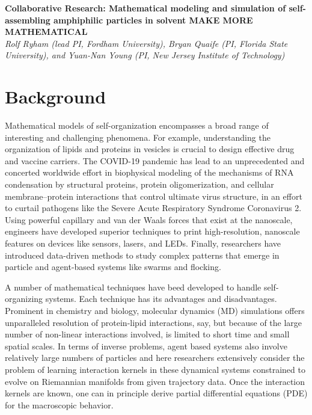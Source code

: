 \noindent
{\bf Collaborative Research: Mathematical modeling and simulation of
self-assembling amphiphilic particles in solvent {\bf MAKE MORE MATHEMATICAL}} \\
{\em Rolf Ryham (lead PI, Fordham University),
Bryan Quaife (PI, Florida State University), and
Yuan-Nan Young (PI, New Jersey Institute of Technology)}

\section{Background}
\label{sec:background}

Mathematical models of self-organization encompasses a
broad range of interesting and challenging phenomena.
For example, understanding the organization of lipids and proteins in vesicles
is crucial to design effective drug and vaccine carriers.
The COVID-19 pandemic has lead to an unprecedented and concerted worldwide
effort in biophysical modeling of the mechanisms of RNA condensation
by structural proteins, protein oligomerization, and cellular
membrane–protein interactions that control ultimate virus structure,
in an effort to curtail pathogens like the Severe Acute Respiratory Syndrome Coronavirus 2.
Using powerful capillary and van der Waals forces that exist at the nanoscale, engineers
have developed superior techniques to print 
high-resolution, nanoscale features on devices like sensors, lasers, and LEDs.
Finally, researchers have introduced data-driven methods 
to study complex patterns that emerge in particle and agent-based systems like swarms
and flocking.

A number of mathematical techniques have beed developed to handle
self-organizing systems.  Each technique has its advantages and disadvantages.
Prominent in chemistry and biology, molecular
dynamics (MD) simulations offers unparalleled resolution of protein-lipid interactions,
say, but because of the large number of non-linear interactions involved,
is limited to short time and small spatial scales.
In terms of inverse problems,
agent based systems also involve relatively large numbers of particles
and here researchers extensively consider the problem  
of learning interaction kernels in these dynamical systems
constrained to evolve on Riemannian manifolds from given trajectory data.
Once the interaction kernels are known, one can in principle derive
partial differential equations (PDE) for the macroscopic behavior. 

